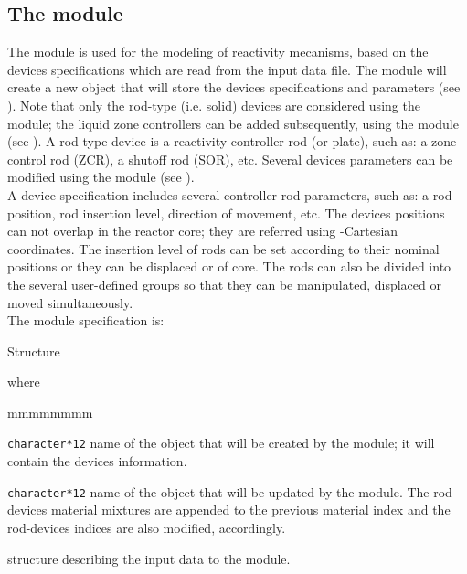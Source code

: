 \subsection{The  module}\label{sect:dev}

\vskip 0.2cm
The  module is used for the modeling of reactivity mecanisms, based
on the devices specifications which are read from the input data file. The module will
create a new  object that will store the devices specifications and
parameters (see ). Note that only the rod-type (i.e. solid) devices are
considered using the  module; the liquid zone controllers can be added
subsequently, using the  module (see ). A rod-type device is a
reactivity controller rod (or plate), such as: a zone control rod (ZCR), a shutoff rod (SOR),
etc. Several devices parameters can be modified using the  module (see ).\\

A device specification includes several controller rod parameters, such as: a rod position,
rod insertion level, direction of movement, etc. The devices positions can not overlap in
the reactor core; they are referred using -Cartesian coordinates. The insertion
level of rods can be set according to their nominal positions or they can be displaced
 or  of core. The rods can also be divided into the several user-defined
groups so that they can be manipulated, displaced or moved simultaneously.\\

\noindent
The  module specification is:

\begin{DataStructure}{Structure }
  \moc{:=} 
 \moc{::} 
\end{DataStructure}

\noindent where

\begin{ListeDeDescription}{mmmmmmmm}

\item[\dusa{DEVICE}] \texttt{character*12} name of the  object
that will be created by the module; it will contain the devices information.

\item[\dusa{MATEX}] \texttt{character*12} name of the  object
that will be updated by the module. The rod-devices material mixtures are
appended to the previous material index and the rod-devices indices are
also modified, accordingly.

\item[\dstr{descdev}] structure describing the input data to the
 module.

\end{ListeDeDescription}

